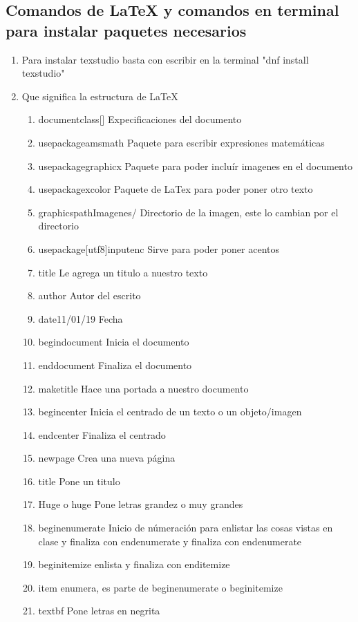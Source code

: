 \documentclass{book}
\begin{document}
	\subsection {Comandos de LaTeX y comandos en terminal para instalar paquetes necesarios}
	\begin{enumerate}
		\item Para instalar texstudio basta con escribir en la terminal "dnf install texstudio"
		\item Que significa la estructura de LaTeX
		\begin{enumerate}
			\item documentclass[]{} Expecificaciones del documento
			\item usepackage{amsmath} Paquete para escribir expresiones matemáticas
			\item usepackage{graphicx} Paquete para poder incluír imagenes en el documento
			\item usepackage{xcolor} Paquete de LaTex para poder poner otro texto
			\item graphicspath{{Imagenes/}} Directorio de la imagen, este lo cambian por el directorio
			\item usepackage[utf8]{inputenc} Sirve para poder poner acentos
			\item title{} Le agrega un titulo a nuestro texto
			\item author{} Autor del escrito
			\item date{11/01/19} Fecha
			\item begin{document} Inicia el documento
			\item end{document} Finaliza el documento
			\item maketitle Hace una portada a nuestro documento
			\item begin{center} Inicia el centrado de un texto o un objeto/imagen
			\item end{center} Finaliza el centrado
			\item newpage Crea una nueva página
			\item title{} Pone un titulo
			\item Huge o huge Pone letras grandez o muy grandes
			\item begin{enumerate} Inicio de númeración para enlistar las cosas vistas en clase y finaliza con end{enumerate} y finaliza con end{enumerate}
			\item begin{itemize} enlista y finaliza con end{itemize}
			\item item enumera, es parte de begin{enumerate} o begin{itemize}
			\item textbf Pone letras en negrita
			
		\end{enumerate}
		
	\end{enumerate}
	
\end{document}
